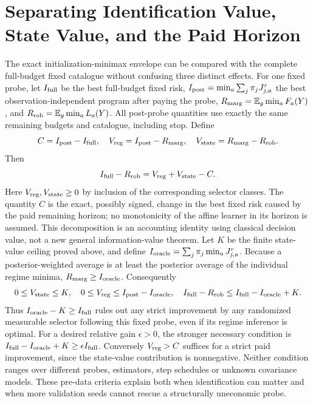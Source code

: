 \section{Separating Identification Value, State Value, and the Paid Horizon}
The exact initialization-minimax envelope can be compared with the complete
full-budget fixed catalogue without confusing three distinct effects.
For one fixed probe, let $I_{\rm full}$ be the best full-budget fixed risk,
$I_{\rm post}=\min_a\sum_j\pi_jJ_{j,a}^{r}$ the best observation-independent
program after paying the probe, $R_{\rm marg}=\mathbb E_g\min_aF_a(Y)$,
and $R_{\rm rob}=\mathbb E_g\min_aL_a(Y)$.
All post-probe quantities use exactly the same remaining budgets and catalogue,
including stop.
Define
\[
C=I_{\rm post}-I_{\rm full},\quad
V_{\rm reg}=I_{\rm post}-R_{\rm marg},\quad
V_{\rm state}=R_{\rm marg}-R_{\rm rob}.
\]
Then
\[
I_{\rm full}-R_{\rm rob}=V_{\rm reg}+V_{\rm state}-C.
\]
Here $V_{\rm reg},V_{\rm state}\ge0$ by inclusion of the corresponding selector
classes. The quantity $C$ is the exact, possibly signed, change in the best
fixed risk caused by the paid remaining horizon; no monotonicity of the affine
learner in its horizon is assumed.
This decomposition is an accounting identity using classical decision value,
not a new general information-value theorem.
Let $K$ be the finite state-value ceiling proved above, and define
$I_{\rm oracle}=\sum_j\pi_j\min_aJ_{j,a}^{r}$.
Because a posterior-weighted average is at least the posterior average of the
individual regime minima, $R_{\rm marg}\ge I_{\rm oracle}$.
Consequently
\[
0\le V_{\rm state}\le K,\quad
0\le V_{\rm reg}\le I_{\rm post}-I_{\rm oracle},\quad
I_{\rm full}-R_{\rm rob}\le I_{\rm full}-I_{\rm oracle}+K.
\]
Thus $I_{\rm oracle}-K\ge I_{\rm full}$ rules out any strict improvement by
any randomized measurable selector following this fixed probe, even if its
regime inference is optimal.
For a desired relative gain $\epsilon>0$, the stronger necessary condition is
$I_{\rm full}-I_{\rm oracle}+K\ge\epsilon I_{\rm full}$.
Conversely $V_{\rm reg}>C$ suffices for a strict paid improvement, since the
state-value contribution is nonnegative.
Neither condition ranges over different probes, estimators, step schedules or
unknown covariance models.
These pre-data criteria explain both when identification can matter and when
more validation seeds cannot rescue a structurally uneconomic probe.
